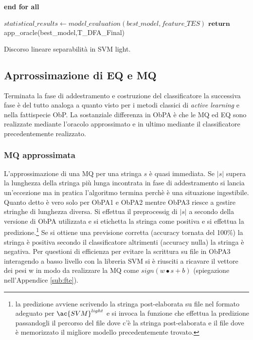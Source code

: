 \begin{algorithm}
\begin{algorithmic}[1]
   \EndFor
   \State \textbf{end for all}

\State $statistical\_results \gets model\_evaluation(best\_model,feature\_TES)$ 
\State $\textbf{return}$ app\_oracle(best\_model,T\_DFA\_Final) 

   
\end{algorithmic}
\end{algorithm}

Discorso lineare separabilità in SVM light.

\subsection{Aprrossimazione di EQ e MQ}
Terminata la fase di addestramento e costruzione del classificatore la successiva fase  è  del tutto analoga a quanto visto per i metodi classici di \textit{active learning} e nella fattispecie \ac{ObP}. La sostanziale differenza in \ac{ObPA} è che le \ac{MQ} ed \ac{EQ} sono realizzate mediante l'oracolo approssimato e in ultimo mediante il classificatore precedentemente realizzato.
\subsubsection{MQ approssimata}
L'approssimazione di una \ac{MQ} per una stringa $s$ è quasi immediata. Se $|s|$ supera la lunghezza della stringa più lunga incontrata in fase di addestramento si lancia un'eccezione ma in pratica l'algoritmo termina perchè è una situazione ingestibile. Quanto detto è vero solo per \ac{ObPA}1 e \ac{ObPA}2 mentre \ac{ObPA}3 riesce a gestire stringhe di lunghezza diversa. Si effettua il preprocessig di $|s|$ a secondo della versione di \ac{ObPA} utilizzata e si etichetta la stringa come positiva e si effettua la predizione.\footnote{la predizione avviene scrivendo la stringa post-elaborata su file nel formato adeguato per $\ac{SVM}^{light}$ e si invoca la funzione che effettua la predizione passandogli il percorso del file dove c'è la stringa post-elaborata e il file dove è memorizzato il migliore modello precedentemente trovato.} Se si ottiene una previsione corretta (accuracy tornata del 100$\%$) la stringa è positiva secondo il classificatore altrimenti (accuracy nulla) la stringa è negativa. Per questioni di efficienza per evitare la scrittura su file in \ac{ObPA}3 interagendo a basso livello con la libreria \ac{SVM} si è riusciti a ricavare il vettore dei pesi w in modo da realizzare la \ac{MQ} come $sign(w \bullet s + b)$ (spiegazione nell'Appendice  \ref{sub:fte}).
 
